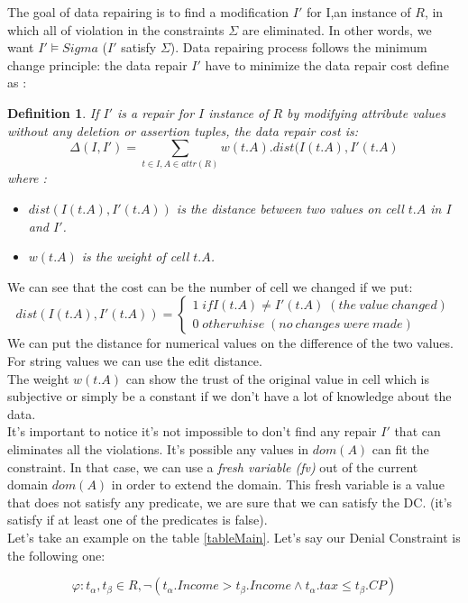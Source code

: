 \documentclass[letterpaper, 12pt]{report}
\newtheorem{mydef}{Definition}
\begin{document}
The goal of data repairing is to find a modification $I'$ for I,an instance of $R$, in which all of violation in the constraints $\Sigma$ are eliminated. In other words, we want $I' \models Sigma$ ($I'$ satisfy $\Sigma$). Data repairing process follows the minimum change principle: the data repair $I'$ have to minimize the data repair cost define as \cite{main}:
\begin{mydef}
If $I'$ is a repair for $I$ instance of $R$ by modifying attribute values without any deletion or assertion tuples, the data repair cost is:
$$ \Delta(I,I') = \sum_{t \in I, A \in attr(R)} w(t.A).dist(I(t.A),I'(t.A) $$
where :
\begin{itemize}
	\item $dist(I(t.A),I'(t.A))$ is the distance between two values on cell $t.A$ in $I$ and $I'$.
	\item $w(t.A)$ is the weight of cell $t.A$.
\end{itemize}
\end{mydef}

We can see that the cost can be the number of cell we changed if we put:
$$
dist(I(t.A),I'(t.A)) =
\left\{
	\begin{array}{ll}
	  1 \; if I(t.A) \neq I'(t.A)\;(the\ value\ changed) \\
	  0 \; otherwhise\;(no\ changes\ were\ made)
	\end{array}
\right.
$$
We can put the distance for numerical values on the difference of the two values. For string values we can use the edit distance.\\

The weight $w(t.A)$ can show the trust of the original value in cell which is subjective or simply be a constant if we don't have a lot of knowledge about the data.\\

It's important to notice it's not impossible to don't find any repair $I'$ that can eliminates all the violations. It's possible any values in $dom(A)$ can fit the constraint. In that case, we can use a \emph{fresh variable (fv)} out of the current domain $dom(A)$ in order to extend the domain. This fresh variable is a value that does not satisfy any predicate, we are sure that we can satisfy the DC. (it's satisfy if at least one of the predicates is false).\\

Let's take an example on the table \ref{tableMain}. Let's say our Denial Constraint is the following one:

$$ \varphi : t_\alpha,t_\beta \in R, \neg(t_\alpha.Income > t_\beta.Income \wedge t_\alpha.tax \leq t_\beta.CP)$$
\end{document}
